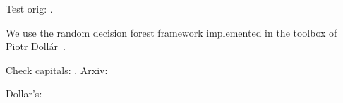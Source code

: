 Test orig: \cite{LimZD13}.

We use the random decision forest framework implemented in the toolbox of Piotr Doll\'ar~\cite{Dollar2013toolbox}.

Check capitals: \cite{Arbelaez09}. %
Arxiv: \cite{Hallman2014}

Dollar's: \cite{Dollar2014fast,DollarICCV13edges}